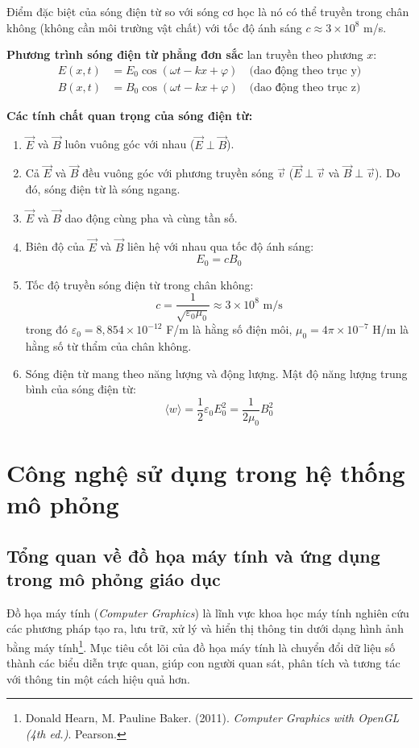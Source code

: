 Điểm đặc biệt của sóng điện từ so với sóng cơ học là nó có thể truyền trong chân không (không cần môi trường vật chất) với tốc độ ánh sáng $c \approx 3 \times 10^8$ m/s.

\textbf{Phương trình sóng điện từ phẳng đơn sắc} lan truyền theo phương $x$:
\begin{align*}
    E(x,t) &= E_0 \cos(\omega t - kx + \varphi) \quad \text{(dao động theo trục y)} \\
    B(x,t) &= B_0 \cos(\omega t - kx + \varphi) \quad \text{(dao động theo trục z)}
\end{align*}

\textbf{Các tính chất quan trọng của sóng điện từ:}
\begin{enumerate}
    \item $\vec{E}$ và $\vec{B}$ luôn vuông góc với nhau ($\vec{E} \perp \vec{B}$).
    \item Cả $\vec{E}$ và $\vec{B}$ đều vuông góc với phương truyền sóng $\vec{v}$ ($\vec{E} \perp \vec{v}$ và $\vec{B} \perp \vec{v}$). Do đó, sóng điện từ là sóng ngang.
    \item $\vec{E}$ và $\vec{B}$ dao động cùng pha và cùng tần số.
    \item Biên độ của $\vec{E}$ và $\vec{B}$ liên hệ với nhau qua tốc độ ánh sáng:
    \[
        E_0 = c B_0
    \]
    \item Tốc độ truyền sóng điện từ trong chân không:
    \[
        c = \frac{1}{\sqrt{\varepsilon_0\mu_0}} \approx 3 \times 10^8 \text{ m/s}
    \]
    trong đó $\varepsilon_0 = 8,854 \times 10^{-12}$ F/m là hằng số điện môi, $\mu_0 = 4\pi \times 10^{-7}$ H/m là hằng số từ thẩm của chân không.
    \item Sóng điện từ mang theo năng lượng và động lượng. Mật độ năng lượng trung bình của sóng điện từ:
    \[
        \langle w \rangle = \frac{1}{2}\varepsilon_0 E_0^2 = \frac{1}{2\mu_0}B_0^2
    \]
\end{enumerate}

\section{Công nghệ sử dụng trong hệ thống mô phỏng}

\subsection{Tổng quan về đồ họa máy tính và ứng dụng trong mô phỏng giáo dục}

Đồ họa máy tính (\textit{Computer Graphics}) là lĩnh vực khoa học máy tính nghiên cứu các phương pháp tạo ra, lưu trữ, xử lý và hiển thị thông tin dưới dạng hình ảnh bằng máy tính\footnote{Donald Hearn, M. Pauline Baker. (2011). \textit{Computer Graphics with OpenGL (4th ed.)}. Pearson.}. Mục tiêu cốt lõi của đồ họa máy tính là chuyển đổi dữ liệu số thành các biểu diễn trực quan, giúp con người quan sát, phân tích và tương tác với thông tin một cách hiệu quả hơn.

